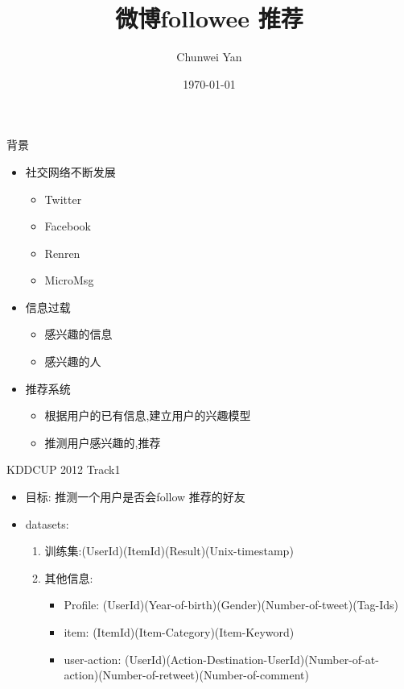 \documentclass{beamer}
\title{微博followee 推荐}
\author{Chunwei Yan}
\institute[PKUSZ]{
\texttt{superjom@sz.pku.edu.cn}
}
\date{\today}
\begin{document}
\begin{frame}[plain]
  \titlepage
\end{frame}

\begin{frame}{背景}
    \begin{itemize}
    \item 社交网络不断发展
        \begin{itemize}
        \item Twitter
        \item Facebook
        \item Renren
        \item MicroMsg
        \end{itemize}
    \item 信息过载
        \begin{itemize}
            \item 感兴趣的信息
            \item 感兴趣的人
        \end{itemize}
    \item  推荐系统
        \begin{itemize}
        \item 根据用户的已有信息,建立用户的兴趣模型
        \item 推测用户感兴趣的,推荐
        \end{itemize}
    \end{itemize}
\end{frame}

\begin{frame}{KDDCUP 2012 Track1}
    \begin{itemize}
    \item 目标: 推测一个用户是否会follow 推荐的好友
    \item datasets: 
        \begin{enumerate}
        \item 训练集:(UserId)(ItemId)(Result)(Unix-timestamp)
        \item 其他信息:
            \begin{itemize}
                \item Profile: (UserId)(Year-of-birth)(Gender)(Number-of-tweet)(Tag-Ids)
                \item item: (ItemId)(Item-Category)(Item-Keyword)
                \item user-action: (UserId)(Action-Destination-UserId)(Number-of-at-action)(Number-of-retweet)(Number-of-comment)
            \end{itemize}
        \end{enumerate}
    \end{itemize}
\end{frame}
\end{document}
